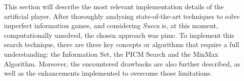 \label{chapter:artificial-player}

This section will describe the most relevant implementation details of the artificial player.
After thoroughly analysing state-of-the-art techniques to solve imperfect information games, and considering \emph{Sueca} is, at this moment, computationally unsolved, the chosen approach was \ac{pimc}.
To implement this search technique, there are three key concepts or algorithms that require a full understanding: the Information Set, the PICM Search and the MinMax Algorithm.
Moreover, the encountered drawbacks are also further described, as well as the enhancements implemented to overcome those limitations.


















